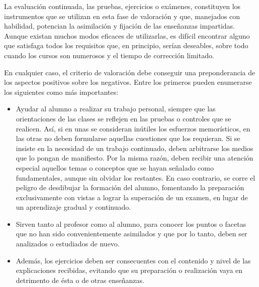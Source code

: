 La evaluación continuada, las pruebas, ejercicios o exámenes, constituyen los instrumentos que se utilizan en esta fase de valoración y que, manejados con habilidad, potencian la asimilación y fijación de las enseñanzas impartidas. Aunque existan muchos modos eficaces de utilizarlas, es difícil encontrar alguno que satisfaga todos los requisitos que, en principio, serían deseables, sobre todo cuando los cursos son numerosos y el tiempo de corrección limitado.

En cualquier caso, el criterio de valoración debe conseguir una preponderancia de los aspectos positivos sobre los negativos. Entre los primeros pueden enumerarse los siguientes como más importantes:
\begin{itemize}
\item	Ayudar al alumno a realizar su trabajo personal, siempre que las orientaciones de las clases se reflejen en las pruebas o controles que se realicen. Así, si en unas se consideran inútiles los esfuerzos memorísticos, en las otras no deben formularse aquellas cuestiones que los requieran. Si se insiste en la necesidad de un trabajo continuado, deben arbitrarse los medios que lo pongan de manifiesto. Por la misma razón, deben recibir una atención especial aquellos temas o conceptos que se hayan señalado como fundamentales, aunque sin olvidar los restantes. En caso contrario, se corre el peligro de desdibujar la formación del alumno, fomentando la preparación exclusivamente con vistas a lograr la superación de un examen, en lugar de un aprendizaje gradual y continuado.
\item	Sirven tanto al profesor como al alumno, para conocer los puntos o facetas que no han sido convenientemente asimilados y que por lo tanto, deben ser analizados o estudiados de nuevo.
\item	Además, los ejercicios deben ser consecuentes con el contenido y nivel de las explicaciones recibidas, evitando que su preparación o realización vaya en detrimento de ésta o de otras enseñanzas.
\end{itemize}

